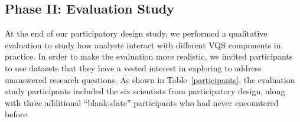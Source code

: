 \subsection{Phase II: Evaluation Study}
At the end of our participatory design study, we performed a qualitative evaluation to study how analysts interact with different VQS components in practice. In order to make the evaluation more realistic, we invited participants to use datasets that they have a vested interest in exploring to address unanswered research questions. As shown in Table~\ref{participants}, the evaluation study participants included the six scientists from participatory design, along with three additional ``blank-slate'' participants who had never encountered \zvpp before. %

